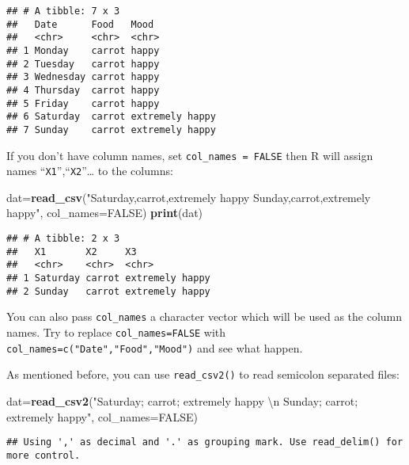 \documentclass[
]{article}
\newenvironment{Shaded}{\begin{snugshade}}{\end{snugshade}}
\newcommand{\CharTok}[1]{\textcolor[rgb]{0.31,0.60,0.02}{#1}}
\newcommand{\DataTypeTok}[1]{\textcolor[rgb]{0.13,0.29,0.53}{#1}}
\newcommand{\KeywordTok}[1]{\textcolor[rgb]{0.13,0.29,0.53}{\textbf{#1}}}
\newcommand{\NormalTok}[1]{#1}
\newcommand{\OtherTok}[1]{\textcolor[rgb]{0.56,0.35,0.01}{#1}}
\newcommand{\StringTok}[1]{\textcolor[rgb]{0.31,0.60,0.02}{#1}}
\begin{document}
\begin{verbatim}
## # A tibble: 7 x 3
##   Date      Food   Mood           
##   <chr>     <chr>  <chr>          
## 1 Monday    carrot happy          
## 2 Tuesday   carrot happy          
## 3 Wednesday carrot happy          
## 4 Thursday  carrot happy          
## 5 Friday    carrot happy          
## 6 Saturday  carrot extremely happy
## 7 Sunday    carrot extremely happy
\end{verbatim}

If you don't have column names, set \texttt{col\_names\ =\ FALSE} then R
will assign names ``\texttt{X1}'',``\texttt{X2}''\ldots{} to the
columns:

\begin{Shaded}
\begin{Highlighting}[]
\NormalTok{dat=}\KeywordTok{read_csv}\NormalTok{(}\StringTok{"Saturday,carrot,extremely happy}
\StringTok{          Sunday,carrot,extremely happy"}\NormalTok{, }\DataTypeTok{col_names=}\OtherTok{FALSE}\NormalTok{)}
\KeywordTok{print}\NormalTok{(dat)}
\end{Highlighting}
\end{Shaded}

\begin{verbatim}
## # A tibble: 2 x 3
##   X1       X2     X3             
##   <chr>    <chr>  <chr>          
## 1 Saturday carrot extremely happy
## 2 Sunday   carrot extremely happy
\end{verbatim}

You can also pass \texttt{col\_names} a character vector which will be
used as the column names. Try to replace \texttt{col\_names=FALSE} with
\texttt{col\_names=c("Date","Food","Mood")} and see what happen.

As mentioned before, you can use \texttt{read\_csv2()} to read semicolon
separated files:

\begin{Shaded}
\begin{Highlighting}[]
\NormalTok{dat=}\KeywordTok{read_csv2}\NormalTok{(}\StringTok{"Saturday; carrot; extremely happy }\CharTok{\textbackslash{}n}\StringTok{ Sunday; carrot; extremely happy"}\NormalTok{, }\DataTypeTok{col_names=}\OtherTok{FALSE}\NormalTok{)}
\end{Highlighting}
\end{Shaded}

\begin{verbatim}
## Using ',' as decimal and '.' as grouping mark. Use read_delim() for more control.
\end{verbatim}
\end{document}
